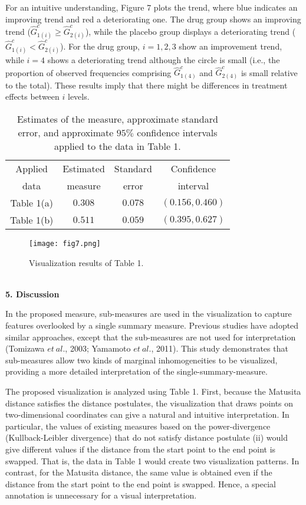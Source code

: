 \documentclass[a4j,12pt]{article}
\begin{document}
For an intuitive understanding, Figure 7 plots the trend, where blue indicates an improving trend and red a deteriorating one. 
The drug group shows an improving trend ($\hat{G}^c_{1(i)} \geq \hat{G}^c_{2(i)}$), while the placebo group displays a deteriorating trend ($\hat{G}^c_{1(i)} < \hat{G}^c_{2(i)}$). 
For the drug group, $i=1, 2, 3$ show an improvement trend, while $i=4$ shows a deteriorating trend although the circle is small (i.e., the proportion of observed frequencies comprising $\hat{G}^c_{1(4)}$ and $\hat{G}^c_{2(4)}$ is small relative to the total). 
These results imply that there might be differences in treatment effects between $i$ levels.
\begin{table}[h]
\small\sf\centering
\caption{Estimates of the measure, approximate standard error, and approximate $95\%$ confidence intervals applied to the data in Table 1.\label{T7}}
\begin{tabular}[!bh]{cccc} \hline
Applied	& Estimated	&Standard	& Confidence	\\
data		& measure	&error		&  interval		\\ \hline
Table 1(a)	& $0.308$	& $0.078$	& $(0.156, 0.460)$	\\
Table 1(b)	& $0.511$	& $0.059$	& $(0.395, 0.627)$	\\ \hline
\end{tabular}
\end{table}
\begin{figure}[h]
\centering
\texttt{[image: fig7.png]}
\caption{Visualization results of Table 1.}
\end{figure}
\\


\noindent \textbf{\large 5. Discussion}

In the proposed measure, sub-measures are used in the visualization to capture features overlooked by a single summary measure. 
Previous studies have adopted similar approaches, except that the sub-measures are not used for interpretation (Tomizawa $et~al.$, 2003; Yamamoto $et~al.$, 2011). 
This study demonstrates that sub-measures allow two kinds of marginal inhomogeneities to be visualized, providing a more detailed interpretation of the single-summary-measure.

The proposed visualization is analyzed using Table 1. 
First, because the Matusita distance satisfies the distance postulates, the visualization that draws points on two-dimensional coordinates can give a natural and intuitive interpretation. 
In particular, the values of existing measures based on the power-divergence (Kullback-Leibler divergence) that do not satisfy distance postulate (ii) would give different values if the distance from the start point to the end point is swapped. 
That is, the data in Table 1 would create two visualization patterns. 
In contrast, for the Matusita distance, the same value is obtained even if the distance from the start point to the end point is swapped. 
Hence, a special annotation is unnecessary for a visual interpretation. 
\end{document}

